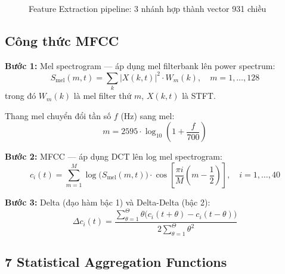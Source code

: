 \documentclass[12pt,a4paper]{article}
\begin{document}
\begin{figure}[H]
{
}%
\caption{Feature Extraction pipeline: 3 nhánh hợp thành vector 931 chiều}
\label{fig:feature-extraction}
\end{figure}

\subsection{Công thức MFCC}

\textbf{Bước 1:} Mel spectrogram — áp dụng mel filterbank lên power spectrum:
\begin{equation}
    S_\text{mel}(m, t) = \sum_{k} |X(k, t)|^2 \cdot W_m(k), \quad m = 1, \ldots, 128
\end{equation}
trong đó $W_m(k)$ là mel filter thứ $m$, $X(k,t)$ là STFT.

Thang mel chuyển đổi tần số $f$ (Hz) sang mel:
\begin{equation}
    m = 2595 \cdot \log_{10}\!\left(1 + \frac{f}{700}\right)
\end{equation}

\textbf{Bước 2:} MFCC — áp dụng DCT lên log mel spectrogram:
\begin{equation}
    c_i(t) = \sum_{m=1}^{M} \log\bigl(S_\text{mel}(m, t)\bigr) \cdot \cos\!\left[\frac{\pi i}{M}\left(m - \frac{1}{2}\right)\right], \quad i = 1, \ldots, 40
\end{equation}

\textbf{Bước 3:} Delta (đạo hàm bậc 1) và Delta-Delta (bậc 2):
\begin{equation}
    \Delta c_i(t) = \frac{\sum_{\theta=1}^{\Theta} \theta \bigl(c_i(t+\theta) - c_i(t-\theta)\bigr)}{2\sum_{\theta=1}^{\Theta} \theta^2}
\end{equation}

\subsection{7 Statistical Aggregation Functions}
\end{document}
